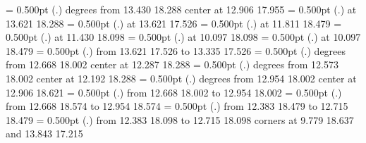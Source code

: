 {{}%
%
%
\linethickness= 0.500pt
\setplotsymbol ({\thinlinefont .})
{\color[rgb]{0,0,0} degrees from 13.430 18.288 center at 12.906 17.955
}%
%
%
\linethickness= 0.500pt
\setplotsymbol ({\thinlinefont .})
{\color[rgb]{0,0,0} at 13.621 18.288
}%
%
%
\linethickness= 0.500pt
\setplotsymbol ({\thinlinefont .})
{\color[rgb]{0,0,0} at 13.621 17.526
}%
%
%
\linethickness= 0.500pt
\setplotsymbol ({\thinlinefont .})
{\color[rgb]{0,0,0} at 11.811 18.479
}%
%
%
\linethickness= 0.500pt
\setplotsymbol ({\thinlinefont .})
{\color[rgb]{0,0,0} at 11.430 18.098
}%
%
%
\linethickness= 0.500pt
\setplotsymbol ({\thinlinefont .})
{\color[rgb]{0,0,0} at 10.097 18.098
}%
%
%
\linethickness= 0.500pt
\setplotsymbol ({\thinlinefont .})
{\color[rgb]{0,0,0} at 10.097 18.479
}%
%
%
\linethickness= 0.500pt
\setplotsymbol ({\thinlinefont .})
{\color[rgb]{0,0,0}\putrule from 13.621 17.526 to 13.335 17.526
}%
%
%
\linethickness= 0.500pt
\setplotsymbol ({\thinlinefont .})
{\color[rgb]{0,0,0} degrees from 12.668 18.002 center at 12.287 18.288
}%
%
%
\linethickness= 0.500pt
\setplotsymbol ({\thinlinefont .})
{\color[rgb]{0,0,0} degrees from 12.573 18.002 center at 12.192 18.288
}%
%
%
\linethickness= 0.500pt
\setplotsymbol ({\thinlinefont .})
{\color[rgb]{0,0,0} degrees from 12.954 18.002 center at 12.906 18.621
}%
%
%
\linethickness= 0.500pt
\setplotsymbol ({\thinlinefont .})
{\color[rgb]{0,0,0}\putrule from 12.668 18.002 to 12.954 18.002
}%
%
%
\linethickness= 0.500pt
\setplotsymbol ({\thinlinefont .})
{\color[rgb]{0,0,0}\putrule from 12.668 18.574 to 12.954 18.574
}%
%
%
\linethickness= 0.500pt
\setplotsymbol ({\thinlinefont .})
{\color[rgb]{0,0,0}\putrule from 12.383 18.479 to 12.715 18.479
}%
%
%
\linethickness= 0.500pt
\setplotsymbol ({\thinlinefont .})
{\color[rgb]{0,0,0}\putrule from 12.383 18.098 to 12.715 18.098
}%
\linethickness=0pt
\putrectangle corners at  9.779 18.637 and 13.843 17.215
\endpicture}
